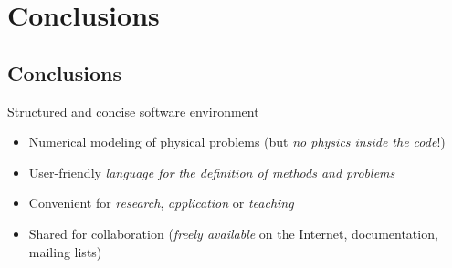 
\part{Conclusions}

\begin{slide}


\begin{center}
\end{center}

\end{slide}


\chapter{Conclusions}

\begin{slide}

\begin{slideitemize}
\item Structured and concise software environment
\begin{itemize}
\item Numerical modeling of physical problems (but \emph{no physics inside the code}!)
\item User-friendly \emph{language for the definition of methods and problems}
\item Convenient for \emph{research}, \emph{application} or \emph{teaching}
\item Shared for collaboration (\emph{freely available} on the Internet,
documentation, mailing lists)
\end{itemize}
\end{slideitemize}

\end{slide}


